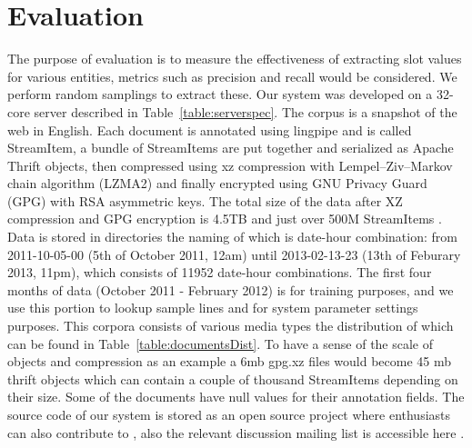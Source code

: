 
\section{Evaluation}
\label{sec:results}

 The purpose of evaluation is to measure the effectiveness of extracting slot values for various entities, metrics such as precision and recall would be considered. We perform random samplings to extract these. Our system was developed on a 32-core server described in Table~\ref{table:serverspec}. The corpus is a snapshot of the web in English. Each document is annotated using lingpipe and is called StreamItem, a bundle of StreamItems are put together and serialized as Apache Thrift objects, then compressed using xz compression with Lempel–Ziv–Markov chain algorithm (LZMA2) and finally encrypted using GNU Privacy Guard (GPG) with RSA asymmetric keys. The total size of the data after XZ compression and GPG encryption is 4.5TB and just over 500M StreamItems \cite{s3}. Data is stored in directories the naming of which is date-hour combination: from 2011-10-05-00 (5th of October 2011, 12am) until 2013-02-13-23 (13th of Feburary 2013, 11pm), which consists of 11952 date-hour combinations. The first four months of data (October 2011 - February 2012) is for training purposes, and we use this portion to lookup sample lines and for system parameter settings purposes. This corpora consists of various media types the distribution of which can be found in Table~\ref{table:documentsDist}. To have a sense of the scale of objects and compression as an example a 6mb gpg.xz files would become 45 mb thrift objects which can contain a couple of thousand StreamItems depending on their size. Some of the documents have null values for their annotation fields. The source code of our system is stored as an open source project where enthusiasts can also contribute to \cite{github}, also the relevant discussion mailing list is accessible here \cite{googlegroups}.
 
